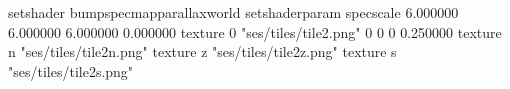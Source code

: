 setshader bumpspecmapparallaxworld
setshaderparam specscale 6.000000 6.000000 6.000000 0.000000
texture 0 "ses/tiles/tile2.png" 0 0 0 0.250000
texture n "ses/tiles/tile2n.png"
texture z "ses/tiles/tile2z.png"
texture s "ses/tiles/tile2s.png"

